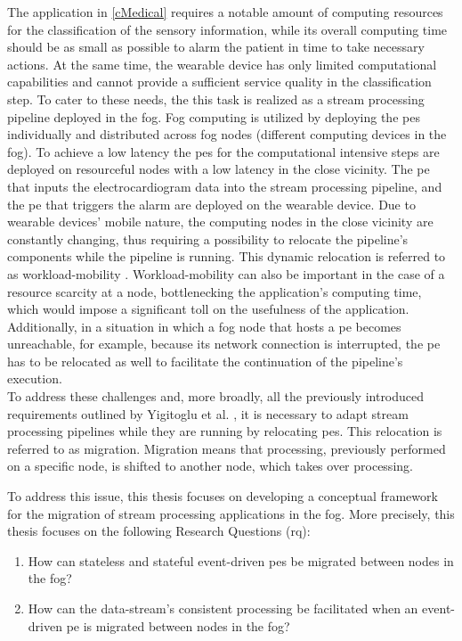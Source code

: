 The application in \ref{cMedical} requires a notable amount of computing resources for the classification of the sensory information, while its overall computing time should be as small as possible to alarm the patient in time to take necessary actions. At the same time, the wearable device has only limited computational capabilities and cannot provide a sufficient service quality in the classification step. To cater to these needs, the this task is realized as a stream processing pipeline deployed in the fog. Fog computing is utilized by deploying the \gls{pe}s individually and distributed across fog nodes (different computing devices in the fog). To achieve a low latency the \gls{pe}s for the computational intensive steps are deployed on resourceful nodes with a low latency in the close vicinity. The \gls{pe} that inputs the electrocardiogram data into the stream processing pipeline, and the \gls{pe} that triggers the alarm are deployed on the wearable device. Due to wearable devices' mobile nature, the computing nodes in the close vicinity are constantly changing, thus requiring a possibility to relocate the pipeline's components while the pipeline is running. This dynamic relocation is referred to as workload-mobility \cite{Yigitoglu.2017}. Workload-mobility can also be important in the case of a resource scarcity at a node, bottlenecking the application's computing time, which would impose a significant toll on the usefulness of the application. Additionally, in a situation in which a fog node that hosts a \gls{pe} becomes unreachable, for example, because its network connection is interrupted, the \gls{pe} has to be relocated as well to facilitate the continuation of the pipeline's execution.\\
To address these challenges and, more broadly, all the previously introduced requirements outlined by Yigitoglu et al. \cite{Yigitoglu.2017}, it is necessary to adapt stream processing pipelines while they are running by relocating \gls{pe}s. This relocation is referred to as migration. Migration means that processing,  previously performed on a specific node, is shifted to another node, which takes over processing.\par
To address this issue, this thesis focuses on developing a conceptual framework for the migration of stream processing applications in the fog. More precisely, this thesis focuses on the following Research Questions (\acrshort{rq}):

\begin{enumerate}[label=RQ\arabic* , wide=0.5em,  leftmargin=*]
    \item \label{rqMigration} How can stateless and stateful event-driven \gls{pe}s be migrated between nodes in the fog?
    \item \label{rqConsistency} How can the data-stream's consistent processing be facilitated when an event-driven \gls{pe} is migrated between nodes in the fog?
\end{enumerate}

